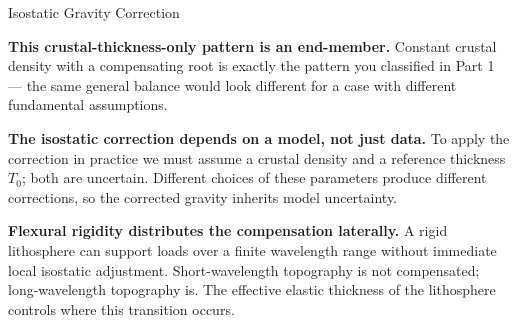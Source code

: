 \begin{activity}{Isostatic Gravity Correction}
\begin{center}
\begin{tikzpicture}[scale=1.1]
\end{tikzpicture}
\end{center}


\textbf{This crustal-thickness-only pattern is an end-member.} Constant crustal density with a compensating root is exactly the pattern you classified in Part 1 --- the same general balance would look different for a case with different fundamental assumptions.

\textbf{The isostatic correction depends on a model, not just data.} To apply the correction in practice we must assume a crustal density and a reference thickness $T_0$; both are uncertain. Different choices of these parameters produce different corrections, so the corrected gravity inherits model uncertainty.

\textbf{Flexural rigidity distributes the compensation laterally.} A rigid lithosphere can support loads over a finite wavelength range without immediate local isostatic adjustment. Short-wavelength topography is not compensated; long-wavelength topography is. The effective elastic thickness of the lithosphere controls where this transition occurs.

\end{activity}